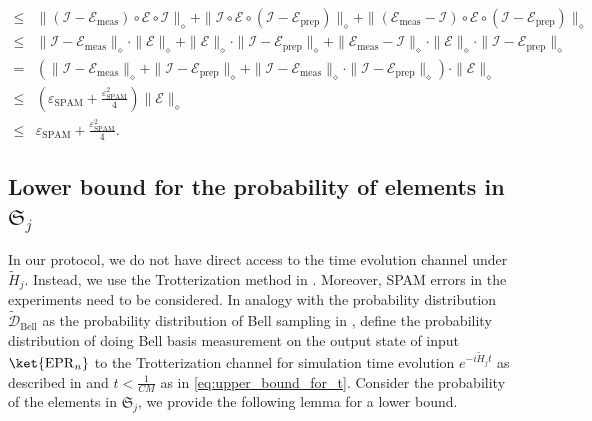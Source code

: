 \documentclass[twocolumn,superscriptaddress,aps,showpacs,amsmath,amstex,amssymb,citeautoscript,floatfix,pra,preprintnumbers]{revtex4-2}
\theoremstyle{plain}
\theoremstyle{plain}
\theoremstyle{plain}
\theoremstyle{plain}
\theoremstyle{plain}
\theoremstyle{plain}
\newcommand{\EPR}{\mathrm{EPR}}
\begin{document}
\begin{appendix}
\begin{equation}
\begin{split}
    \leq & \|\left(\mathcal{I}-\mathcal{E}_{\text{meas}}\right)\circ\mathcal{E}\circ\mathcal{I}\|_{\diamond} + \|\mathcal{I}\circ\mathcal{E}\circ\left(\mathcal{I}-\mathcal{E}_{\text{prep}}\right)\|_{\diamond} + \|\left(\mathcal{E}_{\text{meas}}-\mathcal{I}\right)\circ\mathcal{E}\circ\left(\mathcal{I}-\mathcal{E}_{\text{prep}}\right)\|_{\diamond}\\
    \leq & \|\mathcal{I}-\mathcal{E}_{\text{meas}}\|_{\diamond}\cdot\|\mathcal{E}\|_{\diamond} + \|\mathcal{E}\|_{\diamond}\cdot\|\mathcal{I}-\mathcal{E}_{\text{prep}}\|_{\diamond} + \|\mathcal{E}_{\text{meas}}-\mathcal{I}\|_{\diamond}\cdot\|\mathcal{E}\|_{\diamond}\cdot\|\mathcal{I}-\mathcal{E}_{\text{prep}}\|_{\diamond}\\
    = & \left(\|\mathcal{I}-\mathcal{E}_{\text{meas}}\|_{\diamond} + \|\mathcal{I}-\mathcal{E}_{\text{prep}}\|_{\diamond} + \|\mathcal{I}-\mathcal{E}_{\text{meas}}\|_{\diamond}\cdot\|\mathcal{I}-\mathcal{E}_{\text{prep}}\|_{\diamond}\right)\cdot \|\mathcal{E}\|_{\diamond}\\
    \leq & \left(\varepsilon_{\text{SPAM}} + \frac{\varepsilon^2_{\text{SPAM}}}{4}\right)\|\mathcal{E}\|_{\diamond}\\
    \leq &\varepsilon_{\text{SPAM}} + \frac{\varepsilon^2_{\text{SPAM}}}{4}.
\end{split}
\end{equation}


\subsection{Lower bound for the probability of elements in \texorpdfstring{$\mathfrak{S}_j$}{S j} \label{sec:lower_bound_prob}}
In our protocol, we do not have direct access to the time evolution channel under $\tilde{H}_j$. Instead, we use the Trotterization method in . Moreover, SPAM errors in the experiments need to be considered. In analogy with the probability distribution $\widetilde{\mathcal{D}}_{\text{Bell}}$ as the probability distribution of Bell sampling in , define the probability distribution of doing Bell basis measurement on the output state of input $\ket{\EPR_n}$ to the Trotterization channel for simulation time evolution $e^{-i\tilde{H}_jt}$ as described in  and $t<\frac{1}{CM}$ as in \eqref{eq:upper_bound_for_t}. Consider the probability of the elements in $\mathfrak{S}_j$, we provide the following lemma for a lower bound.


\end{appendix}
\end{document}
